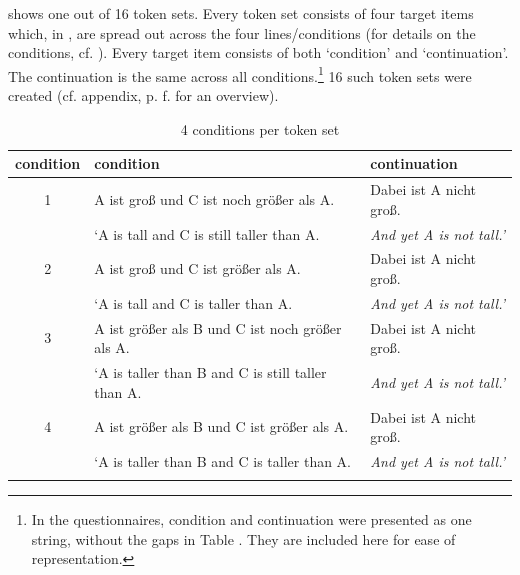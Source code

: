 \documentclass[output=paper,
modfonts
]{langscibook}
\begin{document}
 shows one out of 16 token sets. Every token set consists of four target items which, in , are spread out across the four lines/conditions (for details on the conditions, cf. ). Every target item consists of both `condition' and `continuation'. The continuation is the same across all conditions.\footnote{In the questionnaires, condition and continuation were presented as one string, without the gaps in Table . They are included here for ease of representation.} 16 such token sets were created (cf. appendix, p. \pageref{tab:16_contexts}f. for an overview).

\begin{table}\small
\begin{tabular}{cll}
\lsptoprule
condition & condition & continuation \\
\midrule 
1 & A ist groß \hspace{25pt} und C ist noch größer als A. & Dabei ist A nicht groß. \\
 & {`A is tall \hspace{32pt} and C is \hspace{0.4pt} still \hspace{2pt} taller than A.} & \textit{And yet A is not tall.'} \\
\midrule
2 & A ist groß \hspace{25pt} und C ist \hspace{16pt} größer als A. & Dabei ist A nicht groß.  \\
 & {`A is tall \hspace{32pt} and C is \hspace{19pt} taller than A.} & \textit{And yet A is not tall.'} \\
\midrule 
3 & A ist größer als B \hspace{0.65pt} und C ist noch größer als A. & Dabei ist A nicht groß.  \\
 & {`A is taller than B \hspace{2pt} and C is \hspace{0.4pt} still \hspace{2pt} taller than A.} & \textit{And yet A is not tall.'}  \\
\midrule
4 & A ist größer als B \hspace{0.65pt} und C ist \hspace{16pt} größer als A. & Dabei ist A nicht groß.   \\
 & {`A is taller than B \hspace{2pt} and C is \hspace{19pt} taller than A.} & \textit{And yet A is not tall.'}  \\
\lspbottomrule
\end{tabular}
\caption{4 conditions per token set}
\label{tab:4_conds}
\end{table}
\end{document}
